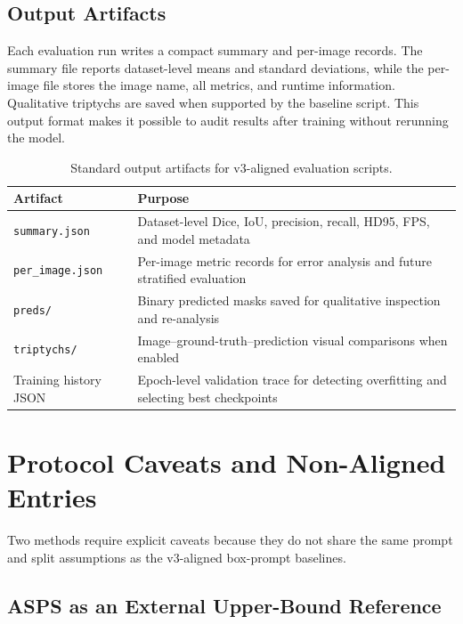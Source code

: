\subsection{Output Artifacts}
\label{sec:output-artifacts}

Each evaluation run writes a compact summary and per-image records. The summary file reports dataset-level means and standard deviations, while the per-image file stores the image name, all metrics, and runtime information. Qualitative triptychs are saved when supported by the baseline script. This output format makes it possible to audit results after training without rerunning the model.

\begin{table}[H]
\centering
\caption{Standard output artifacts for v3-aligned evaluation scripts.}
\label{tab:output-artifacts}
\begin{tabular}{p{3.4cm}p{10.0cm}}
\toprule
\textbf{Artifact} & \textbf{Purpose} \\
\midrule
\texttt{summary.json} & Dataset-level Dice, IoU, precision, recall, HD95, FPS, and model metadata \\
\texttt{per\_image.json} & Per-image metric records for error analysis and future stratified evaluation \\
\texttt{preds/} & Binary predicted masks saved for qualitative inspection and re-analysis \\
\texttt{triptychs/} & Image--ground-truth--prediction visual comparisons when enabled \\
Training history JSON & Epoch-level validation trace for detecting overfitting and selecting best checkpoints \\
\bottomrule
\end{tabular}
\end{table}

\section{Protocol Caveats and Non-Aligned Entries}
\label{sec:protocol-caveats}

Two methods require explicit caveats because they do not share the same prompt and split assumptions as the v3-aligned box-prompt baselines.

\subsection{ASPS as an External Upper-Bound Reference}
\label{sec:asps-caveat}


